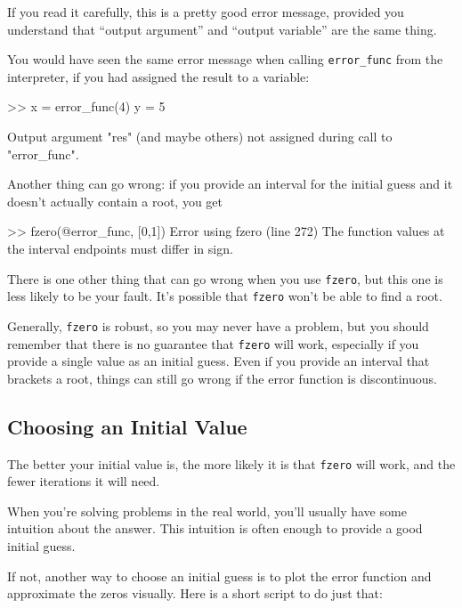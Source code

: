\documentclass[../../book.tex]{subfiles}
\begin{document}
If you read it carefully, this is a pretty good error message,
provided you understand that ``output argument'' and ``output variable'' are the same thing.


You would have seen the same error message when calling \lstinline{error_func} from the interpreter, if you had assigned the result to a variable:

\begin{code}
>> x = error_func(4)
y = 5

Output argument "res" (and maybe others) not assigned during
call to "error_func".
\end{code}

Another thing can go wrong: if you provide an interval for the
initial guess and it doesn't actually contain a root, you get

\begin{code}
>> fzero(@error_func, [0,1])
Error using fzero (line 272)
The function values at the interval endpoints must differ in sign.
\end{code}


There is one other thing that can go wrong when you use \lstinline{fzero}, but
this one is less likely to be your fault.  It's possible that \lstinline{fzero}
won't be able to find a root.

Generally, \lstinline{fzero} is robust, so you may never have a problem, but you should remember that there is no guarantee that \lstinline{fzero} will work, especially  if you provide a single value as an initial guess.  Even if you provide an interval that brackets a root, things can still go wrong if the error function is discontinuous.


\subsection{Choosing an Initial Value}

The better your initial value is, the more likely it is that
\lstinline{fzero} will work, and the fewer iterations it will
need.

When you're solving problems in the real world, you'll usually
have some intuition about the answer.  This intuition is often enough
to provide  a good initial guess.

If not, another way to choose an initial guess is to plot the error function and
approximate the zeros visually.  Here is a short script to do just that:
\end{document}
